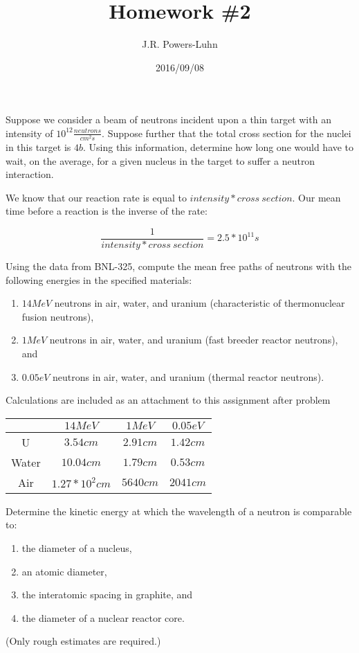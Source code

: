 \documentclass{hw}
\author{J.R. Powers-Luhn}
\date{2016/09/08}
\title{Homework \#2}
\begin{document}
	Suppose we consider a beam of neutrons incident upon a thin target with an intensity of $ 10^{12} \frac{neutrons}{cm^2 s} $. Suppose further that the total cross section for the nuclei in this target is $ 4 b $. Using this information, determine how long one would have to wait, on the average, for a given nucleus in the target to suffer a neutron interaction.

\solution
	We know that our reaction rate is equal to $ intensity * cross\ section $. Our mean time before a reaction is the inverse of the rate:
	
	\[
		\frac{1}{intensity*cross\ section} = 2.5*10^{11}s
	\]

	Using the data from BNL-325, compute the mean free paths of neutrons with the following energies in the specified materials:
	\begin{enumerate}
		\item $ 14 MeV $ neutrons in air, water, and uranium (characteristic of thermonuclear fusion neutrons),
		\item $ 1 MeV $ neutrons in air, water, and uranium (fast breeder reactor neutrons), and
		\item $ 0.05 eV $ neutrons in air, water, and uranium (thermal reactor neutrons).
	\end{enumerate}

\solution
	Calculations are included as an attachment to this assignment after problem 
	\begin{table}[h]
		\centering
		\begin{tabular}{ |c|c|c|c| }
			\hline
			& $ 14MeV $ & $ 1MeV $ & $ 0.05eV$ \\
			\hline
			U & $ 3.54cm $ & $ 2.91cm $ & $ 1.42cm $ \\
			Water & $ 10.04cm $ & $ 1.79cm $ & $ 0.53cm $ \\
			Air & $ 1.27*10^2 cm $ & $ 5640 cm $ & $ 2041 cm $ \\
			\hline
		\end{tabular}
	\end{table}

	Determine the kinetic energy at which the wavelength of a neutron is comparable to:
	\begin{enumerate}
		\item the diameter of a nucleus,
		\item an atomic diameter,
		\item the interatomic spacing in graphite, and
		\item the diameter of a nuclear reactor core.
	\end{enumerate}
	(Only rough estimates are required.)
\end{document}
